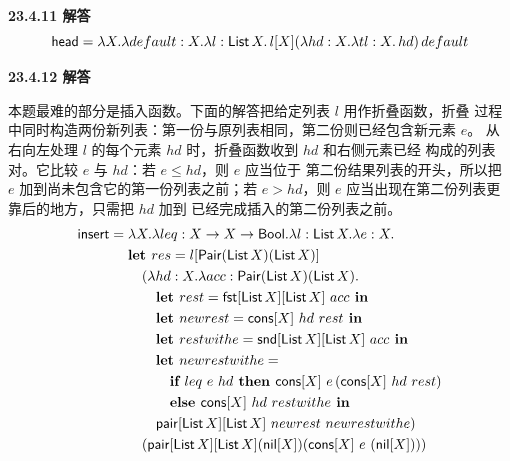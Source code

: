 \begin{taplauthorsolutionentrybox}
\label{sol:author:23.4.11}
\textbf{23.4.11 解答}
\[
\mathsf{head}=
\lambda X.\lambda default:X.\lambda l:\mathsf{List}\,X.\,
l[X](\lambda hd:X.\lambda tl:X.\,hd)\,default
\]
\end{taplauthorsolutionentrybox}

\begin{taplauthorsolutionentrybox}
\label{sol:author:23.4.12}
\textbf{23.4.12 解答}

本题最难的部分是插入函数。下面的解答把给定列表 \(l\) 用作折叠函数，折叠
过程中同时构造两份新列表：第一份与原列表相同，第二份则已经包含新元素 \(e\)。
从右向左处理 \(l\) 的每个元素 \(hd\) 时，折叠函数收到 \(hd\) 和右侧元素已经
构成的列表对。它比较 \(e\) 与 \(hd\)：若 \(e\leq hd\)，则 \(e\) 应当位于
第二份结果列表的开头，所以把 \(e\) 加到尚未包含它的第一份列表之前；若
\(e>hd\)，则 \(e\) 应当出现在第二份列表更靠后的地方，只需把 \(hd\) 加到
已经完成插入的第二份列表之前。
\[
\begin{aligned}
\taplterm{insert}={}&\lambda X.\lambda leq:X\to X\to\tapltype{Bool}.
\lambda l:\tapltype{List}\,X.\lambda e:X.\\
&\textbf{let }res=
l[\tapltype{Pair}(\tapltype{List}\,X)(\tapltype{List}\,X)]\\
&\quad(\lambda hd:X.\lambda acc:\tapltype{Pair}
(\tapltype{List}\,X)(\tapltype{List}\,X).\\
&\qquad\textbf{let }rest=
 \taplterm{fst}[\tapltype{List}\,X][\tapltype{List}\,X]\ acc
 \textbf{ in}\\
&\qquad\textbf{let }newrest=\taplterm{cons}[X]\ hd\ rest\textbf{ in}\\
&\qquad\textbf{let }restwithe=
 \taplterm{snd}[\tapltype{List}\,X][\tapltype{List}\,X]\ acc
 \textbf{ in}\\
&\qquad\textbf{let }newrestwithe=\\
&\qquad\quad\textbf{if }leq\ e\ hd
   \textbf{ then }\taplterm{cons}[X]\ e\,
     (\taplterm{cons}[X]\ hd\ rest)\\
&\qquad\quad\textbf{else }\taplterm{cons}[X]\ hd\ restwithe
   \textbf{ in}\\
&\qquad\taplterm{pair}[\tapltype{List}\,X][\tapltype{List}\,X]
  \ newrest\ newrestwithe)\\
&\quad(\taplterm{pair}[\tapltype{List}\,X][\tapltype{List}\,X]
  (\taplterm{nil}[X])
  (\taplterm{cons}[X]\ e\ (\taplterm{nil}[X])))\\

\end{aligned}\]
\end{taplauthorsolutionentrybox}

